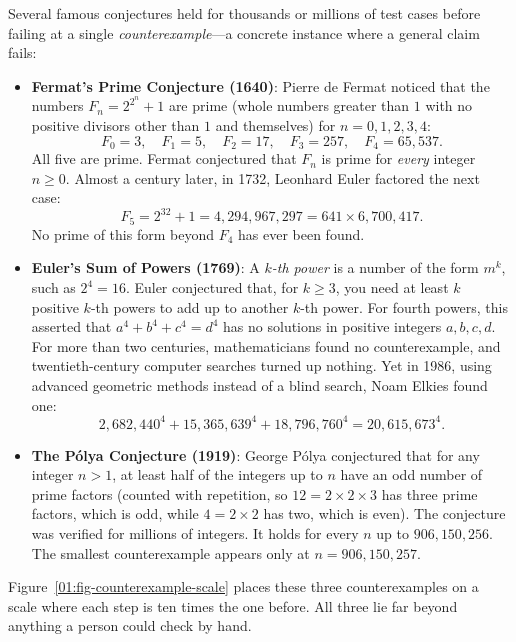 Several famous conjectures held for thousands or millions of test cases before failing at a single \emph{counterexample}---a concrete instance where a general claim fails:
\begin{itemize}
\item \textbf{Fermat's Prime Conjecture (1640)}: Pierre de Fermat noticed that the numbers $F_n = 2^{2^n} + 1$ are prime (whole numbers greater than $1$ with no positive divisors other than $1$ and themselves) for $n = 0, 1, 2, 3, 4$:
\[
F_0 = 3, \quad F_1 = 5, \quad F_2 = 17, \quad F_3 = 257, \quad F_4 = 65{,}537.
\]
All five are prime. Fermat conjectured that $F_n$ is prime for \emph{every} integer $n \ge 0$. Almost a century later, in 1732, Leonhard Euler factored the next case:
\[
F_5 = 2^{32} + 1 = 4{,}294{,}967{,}297 = 641 \times 6{,}700{,}417.
\]
No prime of this form beyond $F_4$ has ever been found.
\item \textbf{Euler's Sum of Powers (1769)}: A \emph{$k$-th power} is a number of the form $m^k$, such as $2^4 = 16$. Euler conjectured that, for $k \ge 3$, you need at least $k$ positive $k$-th powers to add up to another $k$-th power. For fourth powers, this asserted that $a^4 + b^4 + c^4 = d^4$ has no solutions in positive integers $a, b, c, d$. For more than two centuries, mathematicians found no counterexample, and twentieth-century computer searches turned up nothing. Yet in 1986, using advanced geometric methods instead of a blind search, Noam Elkies found one:
\[
2{,}682{,}440^4 + 15{,}365{,}639^4 + 18{,}796{,}760^4 = 20{,}615{,}673^4.
\]
\item \textbf{The P\'olya Conjecture (1919)}: George P\'olya conjectured that for any integer $n > 1$, at least half of the integers up to $n$ have an odd number of prime factors (counted with repetition, so $12 = 2 \times 2 \times 3$ has three prime factors, which is odd, while $4 = 2 \times 2$ has two, which is even). The conjecture was verified for millions of integers. It holds for every $n$ up to $906{,}150{,}256$. The smallest counterexample appears only at $n = 906{,}150{,}257$.
\end{itemize}

Figure~\ref{01:fig-counterexample-scale} places these three counterexamples on a scale where each step is ten times the one before. All three lie far beyond anything a person could check by hand.

